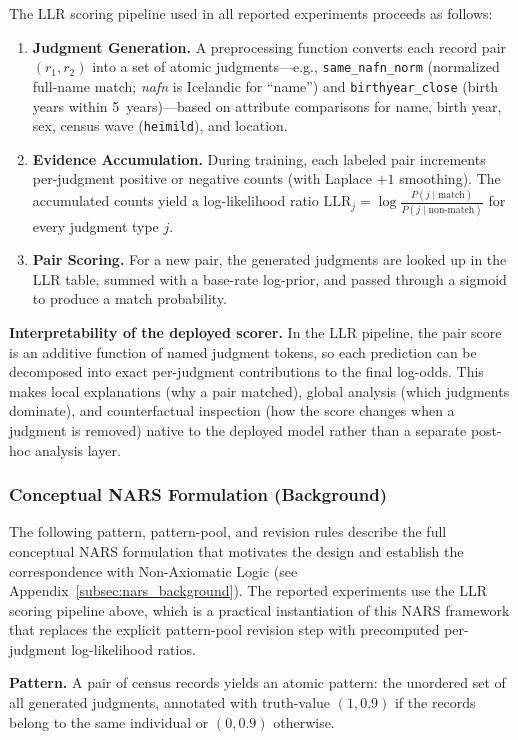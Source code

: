 \documentclass{article}
\begin{document}
The LLR scoring pipeline used in all reported experiments proceeds as follows:
\begin{enumerate}
    \item \textbf{Judgment Generation.} A preprocessing function converts each record pair $(r_1, r_2)$ into a set of atomic judgments---e.g., \texttt{same\_nafn\_norm} (normalized full-name match; \emph{nafn} is Icelandic for ``name'') and \texttt{birthyear\_close} (birth years within 5~years)---based on attribute comparisons for name, birth year, sex, census wave (\texttt{heimild}), and location.
    \item \textbf{Evidence Accumulation.} During training, each labeled pair increments per-judgment positive or negative counts (with Laplace $+1$ smoothing). The accumulated counts yield a log-likelihood ratio $\mathrm{LLR}_j = \log\frac{P(j \mid \text{match})}{P(j \mid \text{non-match})}$ for every judgment type $j$.
    \item \textbf{Pair Scoring.} For a new pair, the generated judgments are looked up in the LLR table, summed with a base-rate log-prior, and passed through a sigmoid to produce a match probability.
\end{enumerate}

\textbf{Interpretability of the deployed scorer.} In the LLR pipeline, the pair score is an additive function of named judgment tokens, so each prediction can be decomposed into exact per-judgment contributions to the final log-odds. This makes local explanations (why a pair matched), global analysis (which judgments dominate), and counterfactual inspection (how the score changes when a judgment is removed) native to the deployed model rather than a separate post-hoc analysis layer.

\subsubsection{Conceptual NARS Formulation (Background)}
\label{subsec:conceptual_nars}
The following pattern, pattern-pool, and revision rules describe the full conceptual NARS formulation that motivates the design and establish the correspondence with Non-Axiomatic Logic (see Appendix~\ref{subsec:nars_background}). The reported experiments use the LLR scoring pipeline above, which is a practical instantiation of this NARS framework that replaces the explicit pattern-pool revision step with precomputed per-judgment log-likelihood ratios.

\textbf{Pattern.} A pair of census records yields an atomic pattern: the unordered set of all generated judgments, annotated with truth-value $(1, 0.9)$ if the records belong to the same individual or $(0, 0.9)$ otherwise.
\end{document}
